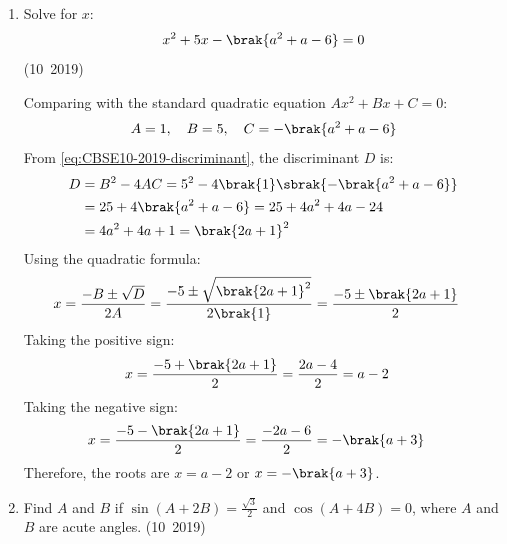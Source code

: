 \begin{enumerate}[label=\thesubsection.\arabic*, ref=\thesubsection.\theenumi]
	\item Solve for $x$:
	\begin{align}
		x^2 + 5x - \brak{a^2 + a - 6} = 0
	\end{align}
	\hfill (10~2019)
	
	\solution
	Comparing with the standard quadratic equation $Ax^2 + Bx + C = 0$:
	\begin{align}
		A = 1, \quad B = 5, \quad C = -\brak{a^2 + a - 6}
	\end{align}
	From \eqref{eq:CBSE10-2019-discriminant}, the discriminant $D$ is:
	\begin{align}
		D &= B^2 - 4AC = 5^2 - 4\brak{1}\sbrak{-\brak{a^2 + a - 6}} \\
		&= 25 + 4\brak{a^2 + a - 6} = 25 + 4a^2 + 4a - 24 \\
		&= 4a^2 + 4a + 1 = \brak{2a + 1}^2
	\end{align}
	Using the quadratic formula:
	\begin{align}
		x &= \frac{-B \pm \sqrt{D}}{2A} = \frac{-5 \pm \sqrt{\brak{2a + 1}^2}}{2\brak{1}} = \frac{-5 \pm \brak{2a + 1}}{2}
	\end{align}
	Taking the positive sign:
	\begin{align}
		x &= \frac{-5 + \brak{2a + 1}}{2} = \frac{2a - 4}{2} = a - 2
	\end{align}
	Taking the negative sign:
	\begin{align}
		x &= \frac{-5 - \brak{2a + 1}}{2} = \frac{-2a - 6}{2} = -\brak{a + 3}
	\end{align}
	Therefore, the roots are $x = a - 2$ or $x = -\brak{a + 3}$.

	\item Find $A$ and $B$ if $\sin(A+2B)=\frac{\sqrt{3}}{2}$ and $\cos(A+4B)=0$, where $A$ and $B$ are acute angles.
	\hfill (10~2019)
	

\end{enumerate}
